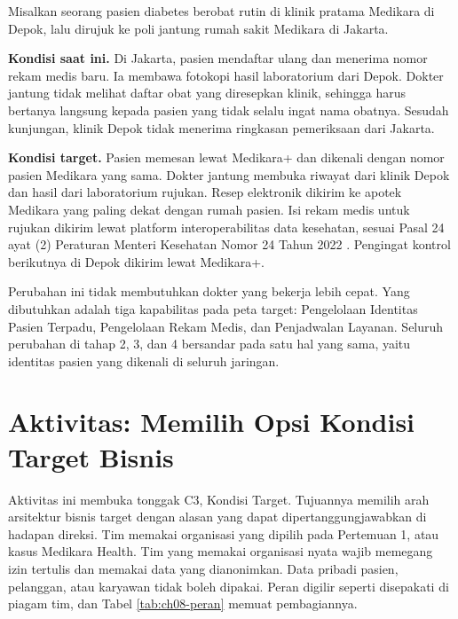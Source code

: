 \begin{kasus}[title={Kasus Medikara Health: Satu Identitas Lintas Fasilitas}, parbox=false]
  Misalkan seorang pasien diabetes berobat rutin di klinik pratama Medikara di Depok, lalu
  dirujuk ke poli jantung rumah sakit Medikara di Jakarta.

  \textbf{Kondisi saat ini.} Di Jakarta, pasien mendaftar ulang dan menerima nomor rekam
  medis baru. Ia membawa fotokopi hasil laboratorium dari Depok. Dokter jantung tidak
  melihat daftar obat yang diresepkan klinik, sehingga harus bertanya langsung kepada
  pasien yang tidak selalu ingat nama obatnya. Sesudah kunjungan, klinik Depok tidak
  menerima ringkasan pemeriksaan dari Jakarta.

  \textbf{Kondisi target.} Pasien memesan lewat Medikara+ dan dikenali dengan nomor pasien
  Medikara yang sama. Dokter jantung membuka riwayat dari klinik Depok dan hasil dari
  laboratorium rujukan. Resep elektronik dikirim ke apotek Medikara yang paling dekat dengan
  rumah pasien. Isi rekam medis untuk rujukan dikirim lewat platform interoperabilitas data
  kesehatan, sesuai Pasal 24 ayat (2) Peraturan Menteri Kesehatan Nomor 24 Tahun 2022
  \cite{permenkes24-2022}. Pengingat kontrol berikutnya di Depok dikirim lewat Medikara+.

  Perubahan ini tidak membutuhkan dokter yang bekerja lebih cepat. Yang dibutuhkan adalah
  tiga kapabilitas pada peta target: Pengelolaan Identitas Pasien Terpadu, Pengelolaan
  Rekam Medis, dan Penjadwalan Layanan. Seluruh perubahan di tahap 2, 3, dan 4 bersandar
  pada satu hal yang sama, yaitu identitas pasien yang dikenali di seluruh jaringan.
\end{kasus}

\section{Aktivitas: Memilih Opsi Kondisi Target Bisnis}

Aktivitas ini membuka tonggak C3, Kondisi Target. Tujuannya memilih arah arsitektur bisnis
target dengan alasan yang dapat dipertanggungjawabkan di hadapan direksi. Tim memakai
organisasi yang dipilih pada Pertemuan 1, atau kasus Medikara Health. Tim yang memakai
organisasi nyata wajib memegang izin tertulis dan memakai data yang dianonimkan. Data
pribadi pasien, pelanggan, atau karyawan tidak boleh dipakai. Peran digilir seperti
disepakati di piagam tim, dan Tabel \ref{tab:ch08-peran} memuat pembagiannya.

